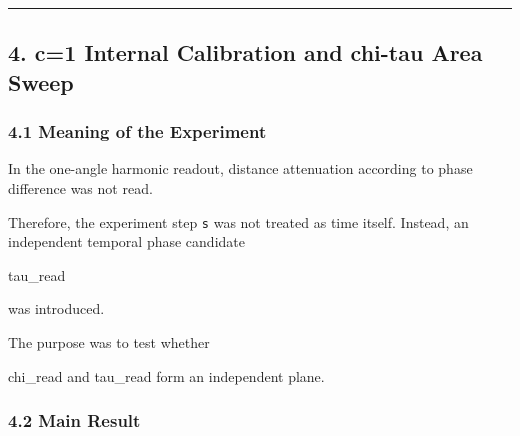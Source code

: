 \documentclass[
]{article}
\newenvironment{Shaded}{}{}
\newcommand{\NormalTok}[1]{#1}
\begin{document}
\begin{center}\rule{0.5\linewidth}{0.5pt}\end{center}

\subsection{4. c=1 Internal Calibration and chi-tau Area
Sweep}\label{c1-internal-calibration-and-chi-tau-area-sweep}

\subsubsection{4.1 Meaning of the
Experiment}\label{meaning-of-the-experiment-1}

In the one-angle harmonic readout, distance attenuation according to
phase difference was not read.

Therefore, the experiment step \texttt{s} was not treated as time
itself. Instead, an independent temporal phase candidate

\begin{Shaded}
\begin{Highlighting}[]
\NormalTok{tau\_read}
\end{Highlighting}
\end{Shaded}

was introduced.

The purpose was to test whether

\begin{Shaded}
\begin{Highlighting}[]
\NormalTok{chi\_read and tau\_read form an independent plane.}
\end{Highlighting}
\end{Shaded}

\subsubsection{4.2 Main Result}\label{main-result-2}
\end{document}
